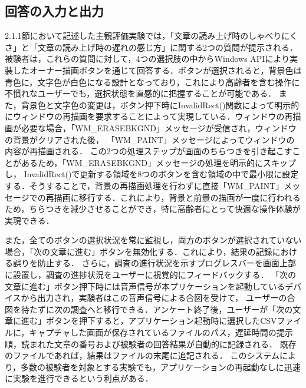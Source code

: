 \subsection{回答の入力と出力}
2.1.1節において記述した主観評価実験では，「文章の読み上げ時のしゃべりにくさ」と「文章の読み上げ時の遅れの感じ方」に関する2つの質問が提示される．
被験者は，これらの質問に対して，4つの選択肢の中からWindows APIにより実装したオーナー描画ボタン\cite{Win32API-reference}を通じて回答する．ボタンが選択されると，背景色は青色に，文字色が白色になる設計となっており，これにより高齢者を含む操作に不慣れなユーザーでも，選択状態を直感的に把握することが可能である．
また，背景色と文字色の変更は，ボタン押下時にInvalidRect()関数によって明示的にウィンドウの再描画を要求することによって実現している．ウィンドウの再描画が必要な場合，「WM\_ERASEBKGND」メッセージが受信され，ウィンドウの背景がクリアされた後，
「WM\_PAINT」メッセージによってウィンドウの内容が再描画される．
この2つの処理ステップが画面のちらつきを引き起こすことがあるため，「WM\_ERASEBKGND」メッセージの処理を明示的にスキップし，
InvalidRect()で更新する領域を8つのボタンを含む領域の中で最小限に設定する．そうすることで，背景の再描画処理を行わずに直接「WM\_PAINT」メッセージでの再描画に移行する．これにより，背景と前景の描画が一度に行われるため，ちらつきを減少させることができ，特に高齢者にとって快適な操作体験が実現できる．

また，全てのボタンの選択状況を常に監視し，両方のボタンが選択されていない場合，「次の文章に進む」ボタンを無効化する．これにより，結果の記録における誤りを防止する．
さらに，調査の進行状況を示すプログレスバーを画面上部に設置し，調査の進捗状況をユーザーに視覚的にフィードバックする．
「次の文章に進む」ボタン押下時には音声信号が本プリケーションを起動しているデバイスから出力され，実験者はこの音声信号による合図を受けて，
ユーザーの合図を待たずに次の調査へと移行できる．アンケート終了後，ユーザーが「次の文章に進む」ボタンを押下すると，アプリケーション起動時に選択したCSVファイルに，キャプチャした画面が保存されているファイルのパス，遅延時間の提示順，読まれた文章の番号および被験者の回答結果が自動的に記録される．
既存のファイルであれば，結果はファイルの末尾に追記される．
このシステムにより，多数の被験者を対象とする実験でも，アプリケーションの再起動なしに迅速に実験を進行できるという利点がある．
